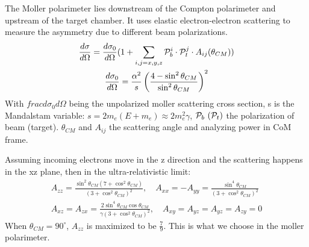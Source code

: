 The Moller polarimeter lies downstream of the Compton polarimeter and upstream 
of the target chamber. It uses elastic electron-electron scattering to measure the
asymmetry due to different beam polarizations. 
\begin{equation}
    \begin{gathered}
	\frac{d\sigma}{d\Omega} = \frac{d\sigma_0}{d\Omega} (1 + \sum_{i,j=x,y,z} \mathcal{P}_b^i \cdot \mathcal{P}_t^j \cdot A_{ij}(\theta_{CM})) \\
	\frac{d\sigma_0}{d\Omega} = \frac{\alpha^2}{s} \left( \frac{4 - \sin^2\theta_{CM}}{\sin^2\theta_{CM}}\right)^2 
    \end{gathered}
    \label{eqn:moller_xsection}
\end{equation}
With $frac{d\sigma_0}{d\Omega}$ being the unpolarized moller scattering cross section,
s is the Mandalstam variable: $s = 2m_e(E+m_e) \approx 2m_e^2\gamma$,
$\mathcal{P}_b \ (\mathcal{P}_t)$ the polarization of beam (target). 
$\theta_{CM}$ and $A_{ij}$ the scattering angle and analyzing power in CoM frame. 

Assuming incoming electrons move in the z direction and the scattering happens
in the xz plane, then in the ultra-relativistic limit:
\begin{equation}
    \begin{gathered}
	A_{zz} = \frac{\sin^2\theta_{CM} (7 + \cos^2\theta_{CM})}{(3+\cos^2\theta_{CM})^2},
	\quad
	A_{xx} = -A_{yy} = \frac{\sin^4\theta_{CM}}{(3+\cos^2\theta_{CM})^2}	\\
	A_{xz} = A_{zx} = \frac{2\sin^4\theta_{CM}\cos\theta_{CM}}{\gamma(3+\cos^2\theta_{CM})^2},
	\quad
	A_{xy} = A_{yz} = A_{yz} = A_{zy} = 0
    \end{gathered}
\end{equation}
When $\theta_{CM} = 90^\circ$, $A_{zz}$ is maximized to be $\frac{7}{9}$. This
is what we choose in the moller polarimeter.

